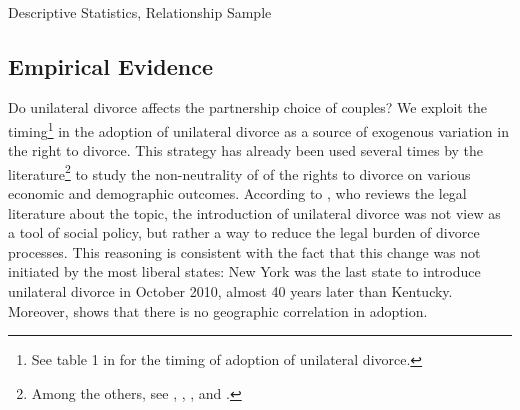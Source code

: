 \documentclass[12pt]{article}
\numberwithin{table}{section}
\begin{document}
\begin{table}[!htbp]\centering
	\caption{\\Descriptive Statistics, Relationship Sample}
	\label{table:sum_coh}
	
\end{table}
\FloatBarrier

\subsection{Empirical Evidence}
Do unilateral divorce affects the partnership choice of couples? We exploit the timing\footnote{See table 1 in \cite{ciacci2017} for the timing of adoption of unilateral divorce.} in the adoption of unilateral divorce as a source of exogenous variation in the right to divorce. This strategy has already been used several times by the literature\footnote{Among the others, see \cite{wolfers2006}, \cite{stevenson2008}, \cite{voena2015}, \cite{reynoso2019} and \cite{ciacci2017}.} to study the non-neutrality of of the rights to divorce on various economic and demographic outcomes. According to \cite{gruber2004}, who reviews the legal literature about the topic, the introduction of unilateral divorce was not view as a tool of social policy, but rather a way to reduce the legal burden of divorce processes. This reasoning is consistent with the fact that this change was not initiated by the most liberal states: New York was the last state to introduce unilateral divorce in October 2010, almost 40 years later than Kentucky. Moreover, \cite{reynoso2019} shows that there is no geographic correlation in adoption. 
\end{document}
